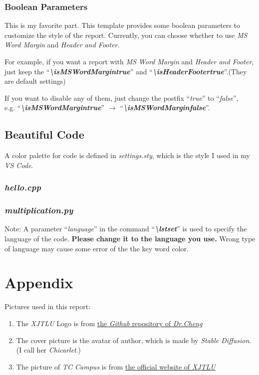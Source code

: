 \documentclass{article}
\begin{document}
\subsubsection{Boolean Parameters}
This is my favorite part. This template provides some boolean parameters to customize the style of the report.
Currently, you can choose whether to use \textit{MS Word Margin} and \textit{Header and Footer}.\par
For example, if you want a report with \textit{MS Word Margin} and \textit{Header and Footer}, 
just keep the ``\textit{\textbf{\textbackslash isMSWordMargintrue}}'' and ``\textit{\textbf{\textbackslash isHeaderFootertrue}}''.(They are default settings)\par
If you want to disable any of them, just change the postfix ``\textit{true}'' to ``\textit{false}'', \\ 
e.g. ``\textit{\textbf{\textbackslash isMSWordMargintrue}}'' \(\rightarrow\) ``\textit{\textbf{\textbackslash isMSWordMarginfalse}}''.

\subsection{Beautiful Code}
\noindent A color palette for code is defined in \textit{settings.sty}, which is the style I used in my \textit{VS Code}.
\subsubsection{\textit{hello.cpp}}


\subsubsection{\textit{multiplication.py}}


\noindent Note: A parameter ``\textit{language}'' in the command ``\textit{\textbf{\textbackslash lstset}}'' is used to specify the language of the code. 
\textbf{Please change it to the language you use.} 
Wrong type of language may cause some error of the the key word color.

\newpage
\section{Appendix}
\noindent Pictures used in this report:
\begin{enumerate}
    \item The \textit{XJTLU} Logo is from \href{https://github.com/feimax/latex_template_for_xjtlu_eee_light}{\underline{the \textit{Github} repository of \textit{Dr.Cheng}}}
    \item The cover picture is the avatar of author, which is made by \textit{Stable Diffusion}. (I call her \textit{Chicarlet}.)
    \item The picture of \textit{TC Campus} is from \href{https://www.xjtlu.edu.cn/en/study/departments/entrepreneurship-and-enterprise-hub}{\underline{the official website of \textit{XJTLU}}}
\end{enumerate}
\end{document}
